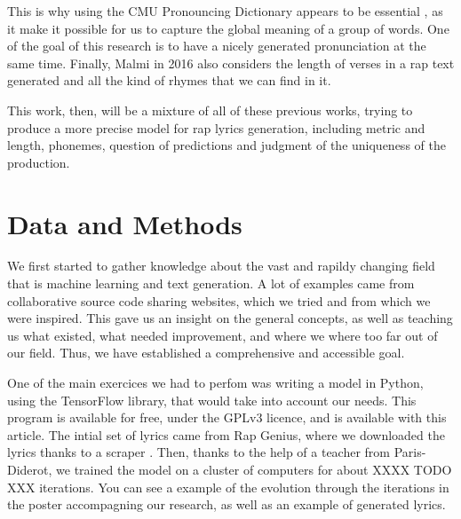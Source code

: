 \documentclass[12pt,a4paper]{article}
\begin{document}
This is why using the CMU Pronouncing Dictionary appears to be essential \cite{hirjee_using_2010}, as it make it possible for us to capture the global meaning of a group of words. One of the goal of this research is to have a nicely generated pronunciation at the same time. Finally, Malmi in 2016 also considers the length of verses in a rap text generated and all the kind of rhymes that we can find in it. \newline

This work, then, will be a mixture of all of these previous works, trying to produce a more precise model for rap lyrics generation, including metric and length, phonemes, question of predictions and judgment of the uniqueness of the production. \newline

\section{Data and Methods}

We first started to gather knowledge about the vast and rapildy changing field that is machine learning and text generation. A lot of examples came from collaborative source code sharing websites, which we tried and from which we were inspired. This gave us an insight on the general concepts, as well as teaching us what existed, what needed improvement, and where we where too far out of our field. Thus, we have established a comprehensive and accessible goal. \newline

One of the main exercices we had to perfom was writing a model in Python, using the TensorFlow library, that would take into account our needs. This program is available for free, under the GPLv3 licence, and is available with this article. The intial set of lyrics came from Rap Genius, where we downloaded the lyrics thanks to a scraper \cite{paupier_raplyrics-scraper_2018}. Then, thanks to the help of a teacher from Paris-Diderot, we trained the model on a cluster of computers for about XXXX TODO XXX iterations. You can see a example of the evolution through the iterations in the poster accompagning our research, as well as an example of generated lyrics.



\end{document}
